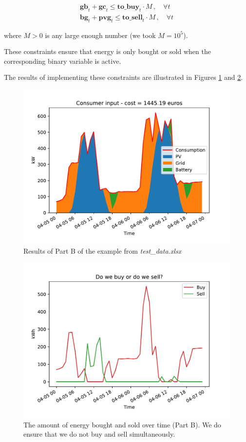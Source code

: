 \documentclass[12pt]{article}
\begin{document}
\begin{eqnarray}
\mathbf{gb}_t + \mathbf{gc}_t \leq \mathbf{to\_buy}_t \cdot M \, , \quad \forall t \\
\mathbf{bg}_t + \mathbf{pvg}_t \leq \mathbf{to\_sell}_t \cdot M \, , \quad \forall t
\end{eqnarray}

where $M > 0$ is any large enough number (we took $M = 10^5$).

These constraints ensure that energy is only bought or sold when the corresponding binary variable is active.

The results of implementing these constraints are illustrated in Figures \ref{fig:resultsPartB} and \ref{fig:buy_or_sellPartB}.

\begin{figure}
\includegraphics[width = \textwidth]{consumer_input_PartB}
\caption{Results of Part B of the example from \textit{test\_data.xlsx}}
\label{fig:resultsPartB}
\end{figure}

\begin{figure}
\includegraphics[width = \textwidth]{buy_or_sell_partB}
\caption{The amount of energy bought and sold over time (Part B). We do ensure that we do not buy and sell simultaneously.}
\label{fig:buy_or_sellPartB}
\end{figure}
\end{document}

